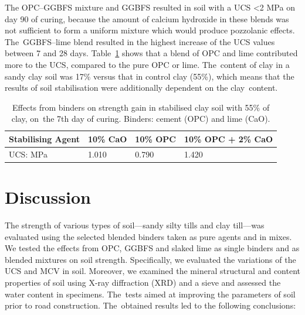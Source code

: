 \documentclass[electronics,article,accept,pdftex,moreauthors]{Definitions/mdpi}
\begin{document}
 The OPC--GGBFS mixture and GGBFS resulted in soil with a UCS <2 MPa {on day 90 of }curing{, }because{ the amount of }calcium hydroxide in these blends was not sufficient to form a uniform mixture which would produce pozzolanic {effects}. The~GGBFS--lime blend {resulted in the highest increase of the} UCS {values }between 7 and 28 days. Table~\ref{tab:5} shows that {a blend of} OPC and lime {contributed more to the} UCS{, }compared to {the} pure OPC or lime. The~{content of clay} in {a} sandy clay {soil} was 17\% versus {that} in control clay (55\%){, which }means that the results of soil stabilisation{ were additionally }dependent{ }on {the} clay~content.
 
\begin{table}[H]\setlength{\tabcolsep}{8.2mm}
\caption{Effects from binders on strength gain in stabilised clay soil with 55\% of clay, on~the 7th day of curing. Binders: cement (OPC) and lime (CaO).}
\small
    \begin{tabular}{@{}llll}
    \toprule
        \textbf{Stabilising Agent} & \textbf{10\% CaO} & \textbf{10\% OPC} & \textbf{10\% OPC + 2\% CaO} \\ 
        \midrule
        UCS: MPa & 1.010 & 0.790 & 1.420 \\ 
        \bottomrule
    \end{tabular}\label{tab:5}
\end{table}

\section{Discussion}

The strength{ }of {various types of soil---}sandy silty tills and clay till---{was} evaluated using {the} selected blended binders taken as pure agents and in mixes. We tested {the effects from OPC, GGBFS and slaked lime as single binders and as} blended mixtures {on soil strength. Specifically, we evaluated the variations of the UCS and MCV} in{ }soil{. Moreover, we }examined the mineral structural and content properties of{ }soil using X-ray diffraction (XRD) and a sieve and assessed the water content {in specimens}. The~tests {aimed at} improving the {parameters} of soil prior to road construction. The~obtained results led to the following conclusions:
\end{document}
